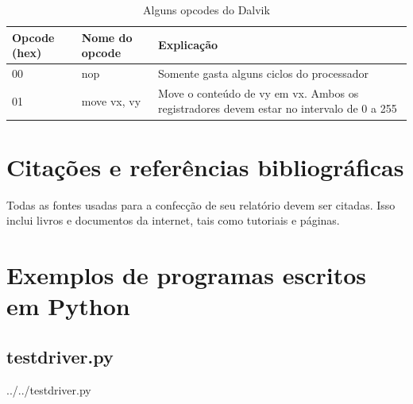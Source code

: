 \documentclass[12pt,a4paper,twoside]{report}
\begin{document}
\begin{table}[h]
  \centering
  \caption{Alguns opcodes do Dalvik \label{tab:opcode2}}
  \begin{tabular}{p{1.5cm}lp{9cm}} \hline
  {\bf Opcode (hex)} & {\bf Nome do opcode} & {\bf Explicação} \\ \hline
  00 & nop & Somente gasta alguns ciclos do processador \\ \hline
  01 & move vx, vy & Move o conteúdo de vy em vx. Ambos os registradores
   devem estar no intervalo de 0 a 255 \\\hline
  \end{tabular}
\end{table}

\chapter{Citações e referências bibliográficas}
Todas as fontes usadas para a confecção de seu relatório devem ser citadas. Isso
inclui livros e documentos da internet, tais como tutoriais e páginas.

\clearpage
{}
\appendix

\chapter{Exemplos de programas escritos em Python \label{ap:Testes}}
\section{testdriver.py}
 {../../testdriver.py}
\end{document}
